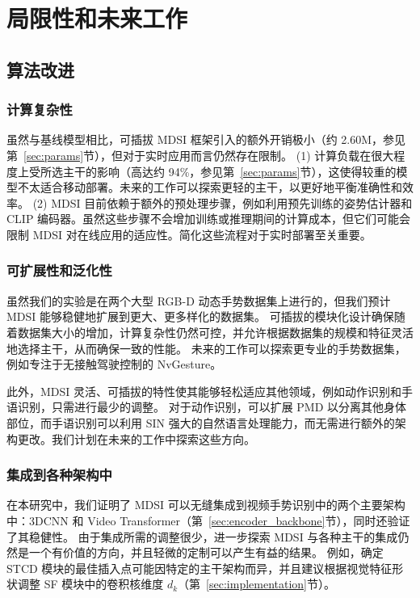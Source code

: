 
\chapter{局限性和未来工作}
\label{sec:limitations}
\section{算法改进}
\subsection{计算复杂性}
虽然与基线模型相比，可插拔 MDSI 框架引入的额外开销极小（约 2.60M，参见第~\ref{sec:params}节），但对于实时应用而言仍然存在限制。
(1) 计算负载在很大程度上受所选主干的影响（高达约 94\%，参见第~\ref{sec:params}节），这使得较重的模型不太适合移动部署。未来的工作可以探索更轻的主干，以更好地平衡准确性和效率。 (2) MDSI 目前依赖于额外的预处理步骤，例如利用预先训练的姿势估计器和 CLIP 编码器。虽然这些步骤不会增加训练或推理期间的计算成本，但它们可能会限制 MDSI 对在线应用的适应性。简化这些流程对于实时部署至关重要。

\subsection{可扩展性和泛化性}
虽然我们的实验是在两个大型 RGB-D 动态手势数据集上进行的，但我们预计 MDSI 能够稳健地扩展到更大、更多样化的数据集。
可插拔的模块化设计确保随着数据集大小的增加，计算复杂性仍然可控，并允许根据数据集的规模和特征灵活地选择主干，从而确保一致的性能。
未来的工作可以探索更专业的手势数据集，例如专注于无接触驾驶控制的 NvGesture。

此外，MDSI 灵活、可插拔的特性使其能够轻松适应其他领域，例如动作识别和手语识别，只需进行最少的调整。
对于动作识别，可以扩展 PMD 以分离其他身体部位，而手语识别可以利用 SIN 强大的自然语言处理能力，而无需进行额外的架构更改。我们计划在未来的工作中探索这些方向。

\subsection{集成到各种架构中}
在本研究中，我们证明了 MDSI 可以无缝集成到视频手势识别中的两个主要架构中：3DCNN 和 Video Transformer（第~\ref{sec:encoder_backbone}节），同时还验证了其稳健性。
由于集成所需的调整很少，进一步探索 MDSI 与各种主干的集成仍然是一个有价值的方向，并且轻微的定制可以产生有益的结果。
例如，确定 STCD 模块的最佳插入点可能因特定的主干架构而异，并且建议根据视觉特征形状调整 SF 模块中的卷积核维度 \(d_k\)（第~\ref{sec:implementation}节）。

